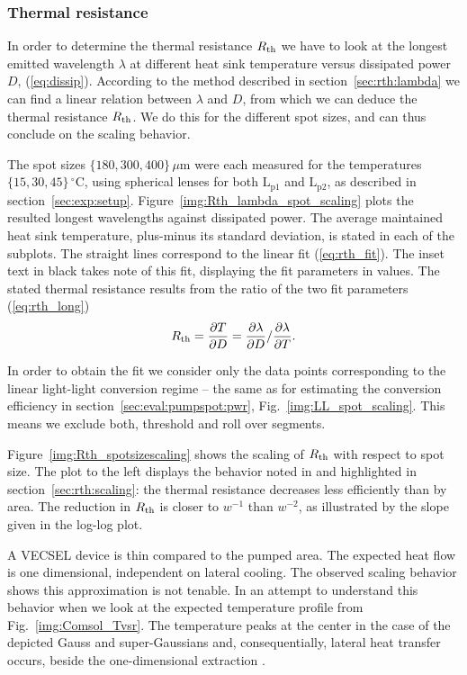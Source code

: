 \subsubsection{Thermal resistance}
\label{sec:eval:pumpspot:rth}

In order to determine the thermal resistance $R_\mathrm{th}$
we have to look at
the longest emitted wavelength $\lambda$
at different heat sink temperature
versus dissipated power $D$,
(\ref{eq:dissip}).
According to the method
described in section~\ref{sec:rth:lambda}
we can find a linear relation
between $\lambda$ and $D$,
from which we can deduce
the thermal resistance $R_\mathrm{th}$.
We do this
for the different spot sizes,
and can thus conclude
on the scaling behavior.

The spot sizes
$\{180,300,400\}\,\mu\mathrm{m}$
were each measured for the temperatures
$\{15,30,45\}\,^\circ\mathrm{C}$,
using spherical lenses
for both $\mathrm{L}_\mathrm{p1}$ and $\mathrm{L}_\mathrm{p2}$,
as described in section~\ref{sec:exp:setup}.
Figure~\ref{img:Rth_lambda_spot_scaling}
plots the resulted longest wavelengths
against dissipated power.
The average maintained heat sink temperature,
plus-minus its standard deviation,
is stated in each of the subplots.
The straight lines correspond
to the linear fit (\ref{eq:rth_fit}).
The inset text in black
takes note of this fit,
displaying the fit parameters in values.
The stated thermal resistance results from
the ratio of the two fit parameters (\ref{eq:rth_long})
\begin{equation*}
R_\mathrm{th} = \frac{\partial T}{\partial D} = \frac{\partial \lambda}{\partial D}/\frac{\partial \lambda}{\partial T}.
\end{equation*}

In order to obtain the fit
we consider only the data points
corresponding to
the linear light-light conversion regime --
the same as for estimating
the conversion efficiency
in section~\ref{sec:eval:pumpspot:pwr},
Fig.~\ref{img:LL_spot_scaling}.
This means
we exclude both,
threshold
and roll over segments.

Figure~\ref{img:Rth_spotsizescaling}
shows the scaling of $R_\mathrm{th}$
with respect to spot size.
The plot to the left
displays the behavior
noted in \cite{Giet2008}
and highlighted
in section~\ref{sec:rth:scaling}:
the thermal resistance
decreases less efficiently
than by area.
The reduction in $R_\mathrm{th}$
is closer to $w^{-1}$
than $w^{-2}$,
as illustrated
by the slope
given in the log-log plot.

A VECSEL device is thin
compared to the pumped area.
The expected heat flow
is one dimensional,
independent on lateral cooling.
The observed scaling behavior
shows this approximation
is not tenable.
In an attempt to understand
this behavior
when we look at
the expected temperature profile
from Fig.~\ref{img:Comsol_Tvsr}.
The temperature peaks
at the center
in the case of the depicted Gauss
and super-Gaussians and,
consequentially,
lateral heat transfer occurs,
beside the one-dimensional extraction
\cite{Chernikov2011}.

